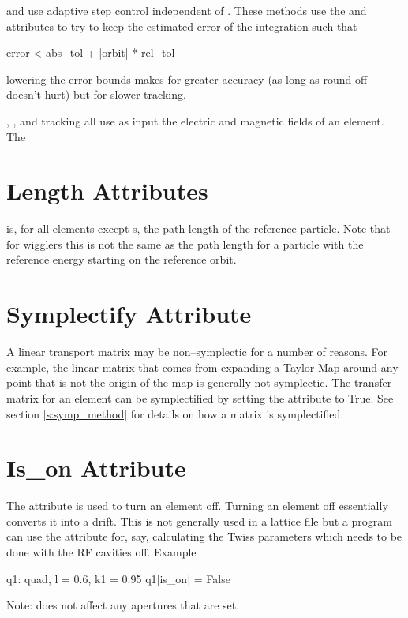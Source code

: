  and  use adaptive step
control independent of . These methods use the  and
 attributes to try to keep the estimated error of the integration
such that
\begin{example}
  error < abs\_tol + |orbit| * rel_tol
\end{example}
lowering the error bounds makes for greater accuracy (as long as round-off 
doesn't hurt) but for slower tracking. 

, , and  tracking all use
as input the electric and magnetic fields of an element. The


\section{Length Attributes}
\label{s:l}

 is, for all elements except s, the path length 
of the reference particle.
Note that for wigglers this is not the same as the path length for
a particle with the reference energy starting on the reference orbit.

\section{Symplectify Attribute}
\label{s:symp}

A linear transport matrix may be non--symplectic for a number of reasons.
For example, the linear matrix that comes from expanding a Taylor Map
around any point that is not the origin of the map is generally not 
symplectic. The transfer matrix for an element can be symplectified by
setting the  attribute to True. See section \ref{s:symp_method}
for details on how a matrix is symplectified.


\section{Is\_on Attribute}
\label{s:is_on}

The  attribute is used to turn an element off. Turning
an element off essentially converts it into a drift. This is not
generally used in a lattice file but a program can use the attribute
for, say, calculating the Twiss parameters which needs to be done
with the RF cavities off. Example
\begin{example}
  q1: quad, l = 0.6, k1 = 0.95
  q1[is_on] = False
\end{example}
Note:  does not affect any apertures that are set.